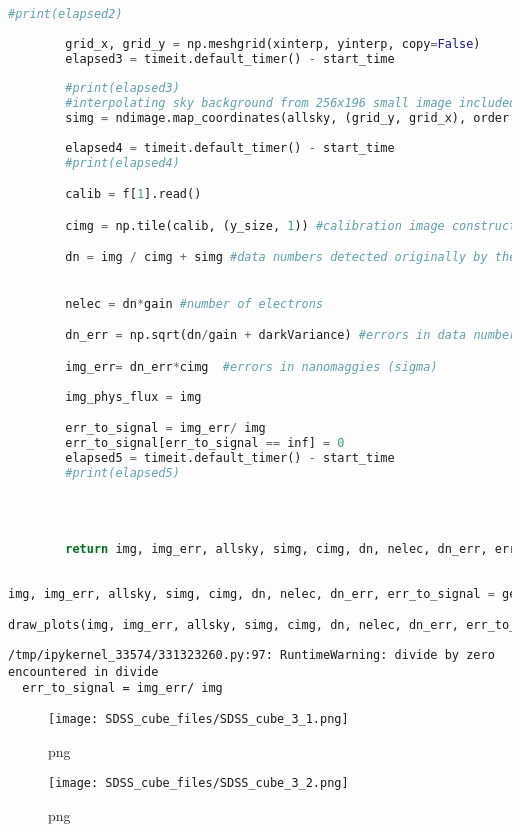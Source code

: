 \begin{lstlisting}[language=Python]
        #print(elapsed2)
        
        grid_x, grid_y = np.meshgrid(xinterp, yinterp, copy=False)
        elapsed3 = timeit.default_timer() - start_time
        
        #print(elapsed3)
        #interpolating sky background from 256x196 small image included in SDSS
        simg = ndimage.map_coordinates(allsky, (grid_y, grid_x), order = 1, mode="nearest")
        
        elapsed4 = timeit.default_timer() - start_time
        #print(elapsed4)

        calib = f[1].read()

        cimg = np.tile(calib, (y_size, 1)) #calibration image constructed from calibration vector

        dn = img / cimg + simg #data numbers detected originally by the detector 
        

        nelec = dn*gain #number of electrons

        dn_err = np.sqrt(dn/gain + darkVariance) #errors in data numbers (sigma)

        img_err= dn_err*cimg  #errors in nanomaggies (sigma)
        
        img_phys_flux = img

        err_to_signal = img_err/ img
        err_to_signal[err_to_signal == inf] = 0
        elapsed5 = timeit.default_timer() - start_time
        #print(elapsed5)
        
        

        
        return img, img_err, allsky, simg, cimg, dn, nelec, dn_err, err_to_signal
    
    
img, img_err, allsky, simg, cimg, dn, nelec, dn_err, err_to_signal = get_image_with_errors(test_image)

draw_plots(img, img_err, allsky, simg, cimg, dn, nelec, dn_err, err_to_signal)
\end{lstlisting}

\begin{lstlisting}
/tmp/ipykernel_33574/331323260.py:97: RuntimeWarning: divide by zero encountered in divide
  err_to_signal = img_err/ img
\end{lstlisting}

\begin{figure}
\centering
\texttt{[image: SDSS\_cube\_files/SDSS\_cube\_3\_1.png]}
\caption{png}
\end{figure}

\begin{figure}
\centering
\texttt{[image: SDSS\_cube\_files/SDSS\_cube\_3\_2.png]}
\caption{png}
\end{figure}

